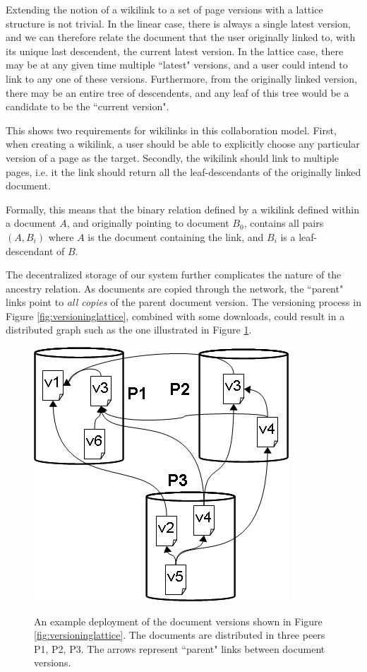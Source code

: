 Extending the notion of a wikilink to a set of page versions with a lattice structure is not trivial. In the linear case, there is always a single latest version, and we can therefore relate the document that the user originally linked to, with its unique last descendent, the current latest version. In the lattice case, there may be at any given time multiple ``latest" versions, and a user could intend to link to any one of these versions. Furthermore, from the originally linked version, there may be an entire tree of descendents, and any leaf of this tree would be a candidate to be the ``current version". 

This shows two requirements for wikilinks in this collaboration model. First, when creating a wikilink, a user should be able to explicitly choose any particular version of a page as the target. Secondly, the wikilink should link to multiple pages, i.e. it the link should return all the leaf-descendants of the originally linked document. 

Formally, this means that the binary relation defined by a wikilink defined within a document $A$, and originally pointing to document $B_0$, contains all pairs $(A, B_i)$ where $A$ is the document containing the link, and $B_i$ is a leaf-descendant of $B$.

The decentralized storage of our system further complicates the nature of the ancestry relation. As documents are copied through the network, the ``parent" links point to \emph{all copies} of the parent document version. The versioning process in Figure \ref{fig:versioninglattice}, combined with some downloads, could result in a distributed graph such as the one illustrated in Figure \ref{fig:versioning-deploy}. 

\begin{figure}[htb]
\centering
\includegraphics[scale=0.5]{doc-links-deploy.png}
\label{fig:versioning-deploy}
\caption{An example deployment of the document versions shown in Figure \ref{fig:versioninglattice}. The documents are distributed in three peers P1, P2, P3. The arrows represent ``parent" links between document versions.}
\end{figure}

